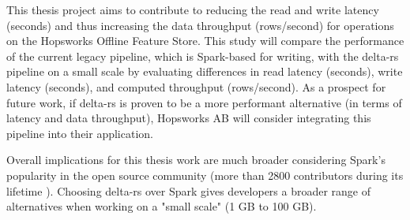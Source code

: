 This thesis project aims to contribute to reducing the read and write latency (seconds) and thus increasing the data throughput (rows/second) for operations on the Hopsworks Offline Feature Store. This study will compare the performance of the current legacy pipeline, which is Spark-based for writing, with the delta-rs pipeline on a small scale by evaluating differences in read latency (seconds), write latency (seconds), and computed throughput (rows/second). As a prospect for future work, if delta-rs is proven to be a more performant alternative (in terms of latency and data throughput), Hopsworks \gls{AB} will consider integrating this pipeline into their application.

Overall implications for this thesis work are much broader considering Spark's popularity in the open source community (more than 2800 contributors during its lifetime \cite{ApacheSparkOpen}). Choosing delta-rs over Spark gives developers a broader range of alternatives when working on a "small scale" (1 GB to 100 GB).